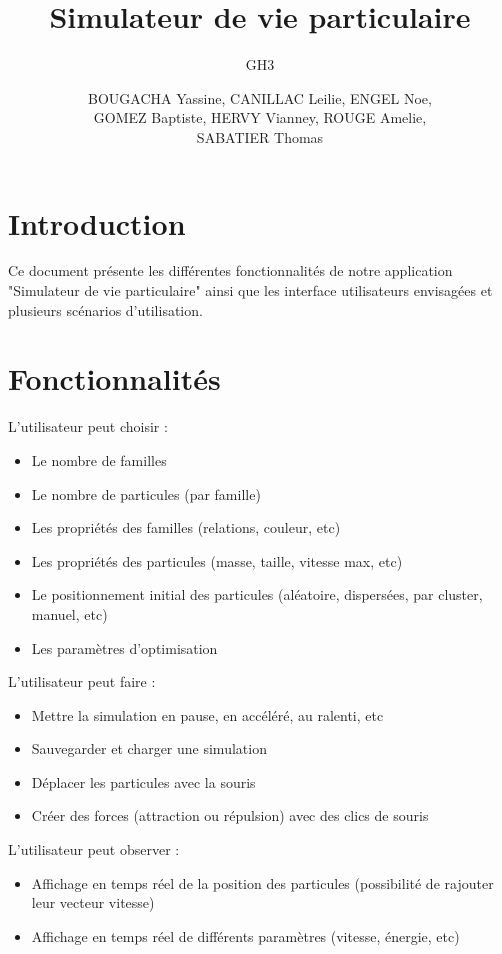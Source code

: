 \documentclass{article}
\title{Simulateur de vie particulaire}
\author{GH3}
\date{BOUGACHA Yassine, CANILLAC Leilie, ENGEL Noe, \\GOMEZ Baptiste, HERVY Vianney, ROUGE Amelie,\\ SABATIER Thomas}
\begin{document}
\maketitle

\section{Introduction}
Ce document présente les différentes fonctionnalités de notre application "Simulateur de vie particulaire" ainsi que les interface utilisateurs envisagées et plusieurs scénarios d'utilisation.

\section{Fonctionnalités}
\noindent L'utilisateur peut choisir :
\begin{itemize}
    \item Le nombre de familles
    \item Le nombre de particules (par famille)
    \item Les propriétés des familles (relations, couleur, etc)
    \item Les propriétés des particules (masse, taille, vitesse max, etc)
    \item Le positionnement initial des particules (aléatoire, dispersées, par cluster, manuel, etc)
    \item Les paramètres d'optimisation
\end{itemize}
\vspace{2em}
L'utilisateur peut faire :
\begin{itemize}
    \item Mettre la simulation en pause, en accéléré, au ralenti, etc
    \item Sauvegarder et charger une simulation
    \item Déplacer les particules avec la souris
    \item Créer des forces (attraction ou répulsion) avec des clics de souris
\end{itemize}
\vspace{2em}
L'utilisateur peut observer :
\begin{itemize}
    \item Affichage en temps réel de la position des particules (possibilité de rajouter leur vecteur vitesse)
    \item Affichage en temps réel de différents paramètres (vitesse, énergie, etc)
\end{itemize}
\end{document}
